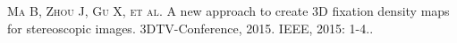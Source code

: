 
\begin{publications}{99}
    \item\textsc{Ma B, Zhou J, Gu X, et al}. {A new approach to create 3D fixation density maps for stereoscopic images}. 3DTV-Conference, 2015. IEEE, 2015: 1-4..
\end{publications}
